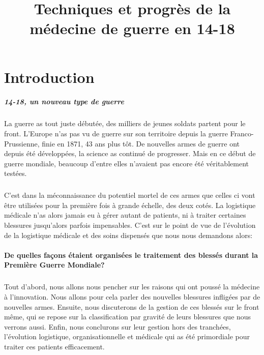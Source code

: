 \documentclass[a4paper, BCOR=0mm, fontsize=12pt, titlepage=firstiscover]{scrreprt}
\title{Techniques et progrès de la médecine de guerre en 14-18}
\date{}
\begin{document}
	
	
	\maketitle
	
	\tableofcontents

	
	
	\chapter*{Introduction}
	\paragraph{14-18, un nouveau type de guerre} %
	La guerre as tout juste débutée, des milliers de jeunes soldats partent pour le front.
	L'Europe n'as pas vu de guerre sur son territoire depuis la guerre Franco-Prussienne, finie en 1871, 43 ans plus tôt.
	De nouvelles armes de guerre ont depuis été développées, la science as continué de progresser.
	Mais en ce début de guerre mondiale, beaucoup d'entre elles n'avaient pas encore été véritablement testées.
	
	\paragraph{} 
	C'est dans la méconnaissance du potentiel mortel de ces armes que celles ci vont être utilisées pour la première fois à grande échelle, des deux cotés.
	La logistique médicale n'as alors jamais eu à gérer autant de patients, ni à traiter certaines blessures jusqu'alors parfois impensables.
	C'est sur le point de vue de l'évolution de la logistique médicale et des soins dispensés que nous nous demandons alors:
	\\\\
	
	{\centering \large \textbf{De quelles façons étaient organisées le traitement des blessés durant la Première Guerre Mondiale?}}
	\\
	\paragraph{}
	Tout d'abord, nous allons nous pencher sur les raisons qui ont poussé la médecine à l'innovation.
	Nous allons pour cela parler des nouvelles blessures infligées par de nouvelles armes.
	Ensuite, nous discuterons de la gestion de ces blessés sur le front même, qui se repose sur la classification par gravité de leurs blessures que nous verrons aussi.
	Enfin, nous conclurons sur leur gestion hors des tranchées, l'évolution logistique, organisationnelle et médicale qui as été primordiale pour traiter ces patients efficacement.
	
\end{document}
